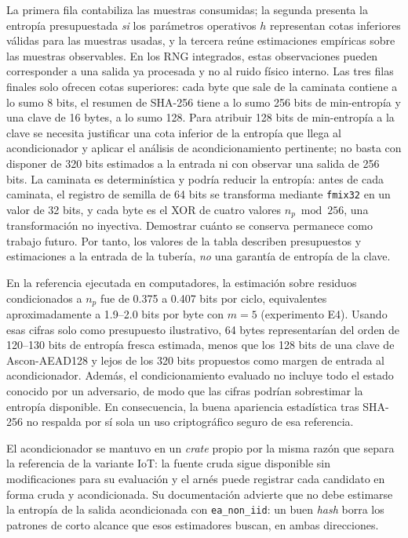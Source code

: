 La primera fila contabiliza las muestras consumidas; la segunda presenta la entropía presupuestada \emph{si} los parámetros operativos $h$ representan cotas inferiores válidas para las muestras usadas, y la tercera reúne estimaciones empíricas sobre las muestras observables. En los RNG integrados, estas observaciones pueden corresponder a una salida ya procesada y no al ruido físico interno. Las tres filas finales solo ofrecen cotas superiores: cada byte que sale de la caminata contiene a lo sumo 8 bits, el resumen de SHA-256 tiene a lo sumo 256 bits de min-entropía y una clave de 16 bytes, a lo sumo 128. Para atribuir 128 bits de min-entropía a la clave se necesita justificar una cota inferior de la entropía que llega al acondicionador y aplicar el análisis de acondicionamiento pertinente; no basta con disponer de 320 bits estimados a la entrada ni con observar una salida de 256 bits. La caminata es determinística y podría reducir la entropía: antes de cada caminata, el registro de semilla de 64 bits se transforma mediante \texttt{fmix32} en un valor de 32 bits, y cada byte es el XOR de cuatro valores $n_p \bmod 256$, una transformación no inyectiva. Demostrar cuánto se conserva permanece como trabajo futuro. Por tanto, los valores de la tabla describen presupuestos y estimaciones a la entrada de la tubería, \emph{no} una garantía de entropía de la clave.

En la referencia ejecutada en computadores, la estimación sobre residuos condicionados a $n_p$ fue de 0.375 a 0.407 bits por ciclo, equivalentes aproximadamente a 1.9--2.0 bits por byte con $m=5$ (experimento E4). Usando esas cifras solo como presupuesto ilustrativo, 64 bytes representarían del orden de 120--130 bits de entropía fresca estimada, menos que los 128 bits de una clave de Ascon-AEAD128 y lejos de los 320 bits propuestos como margen de entrada al acondicionador. Además, el condicionamiento evaluado no incluye todo el estado conocido por un adversario, de modo que las cifras podrían sobrestimar la entropía disponible. En consecuencia, la buena apariencia estadística tras SHA-256 no respalda por sí sola un uso criptográfico seguro de esa referencia.

El acondicionador se mantuvo en un \textit{crate} propio por la misma razón que separa la referencia de la variante IoT: la fuente cruda sigue disponible sin modificaciones para su evaluación y el arnés puede registrar cada candidato en forma cruda y acondicionada. Su documentación advierte que no debe estimarse la entropía de la salida acondicionada con \texttt{ea\_non\_iid}: un buen \textit{hash} borra los patrones de corto alcance que esos estimadores buscan, en ambas direcciones.

